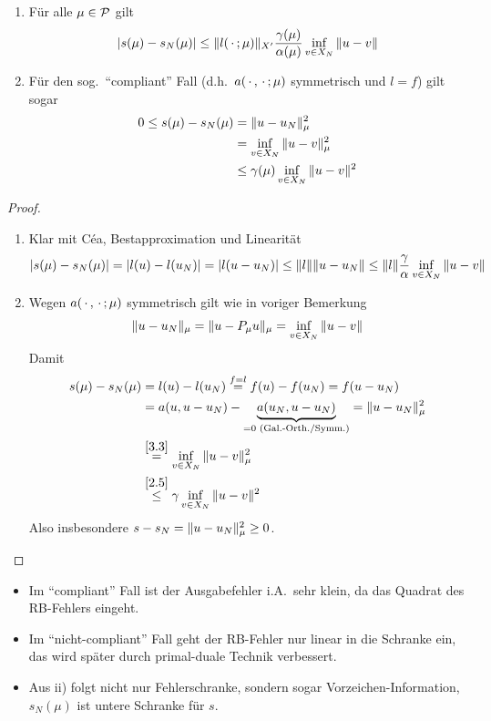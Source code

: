 \begin{satz} \label{3.10} \beginwithlist
	\begin{enumerate}
		\item Für alle $\mu \in \mathcal{P}$ gilt
			\[
				|s(\mu)-s_N(\mu)| \leq \|l(\,\cdot\,;\mu)\|_{X'} \frac{\gamma(\mu)}{\alpha(\mu)} \inf_{v \in X_N} \|u-v\|
			\]
		\item Für den sog.\ ``compliant'' Fall (d.h.\ $a(\,\cdot\,,\,\cdot\,;\mu)$ symmetrisch und $l = f$) gilt sogar
			\begin{align*}
				0 \leq s(\mu)-s_N(\mu) &= \|u-u_N\|_\mu^2\\
				&= \inf_{v \in X_N} \|u-v\|_\mu^2\\
				&\leq \gamma(\mu) \inf_{v \in X_N} \|u-v\|^2
			\end{align*}
	\end{enumerate}

	\begin{proof} \beginwithlistbew
		\begin{enumerate}
			\item Klar mit Céa, Bestapproximation und Linearität
				\[
					|s(\mu)-s_N(\mu)| = |l(u)-l(u_N)| = |l(u-u_N)| \leq \|l\| \|u-u_N\| \leq \|l\| \frac{\gamma}{\alpha} \inf_{v \in X_N} \|u-v\|
				\]
			\item Wegen $a(\,\cdot\,,\,\cdot\,;\mu)$ symmetrisch gilt wie in voriger Bemerkung
				\begin{equation} \label{eq:3.3}
					\|u-u_N\|_\mu = \|u-P_\mu u\|_\mu = \inf_{v \in X_N} \|u-v\|
				\end{equation}
				Damit
				\begin{align*}
					s(\mu) - s_N(\mu) &= l(u)-l(u_N) \stackrel{f=l}{=} f(u) - f(u_N) = f(u-u_N)\\
					&= a(u,u-u_N) - \underbrace{a(u_N,u-u_N)}_{=0 \text{ (Gal.-Orth./Symm.)}} = \|u-u_N\|_\mu^2\\
					&\stackrel{\ref{3.3}}{=} \inf_{v \in X_N} \|u-v\|_\mu^2\\
					&\stackrel{\ref{2.5}}{\leq} \gamma \inf_{v \in X_N} \|u-v\|^2
				\end{align*}
				Also insbesondere $s-s_N = \|u-u_N\|_\mu^2 \geq 0$.
		\end{enumerate}
	\end{proof}
\end{satz}

\begin{bem} \beginwithlistbem
	\begin{itemize}
		\item Im ``compliant'' Fall ist der Ausgabefehler i.A.\ sehr klein, da das Quadrat des RB-Fehlers eingeht.
		\item Im ``nicht-compliant'' Fall geht der RB-Fehler nur linear in die Schranke ein, das wird später durch primal-duale Technik verbessert.
		\item Aus ii) folgt nicht nur Fehlerschranke, sondern sogar Vorzeichen-Information, $s_N(\mu)$ ist untere Schranke für $s$.
	\end{itemize}
\end{bem}

